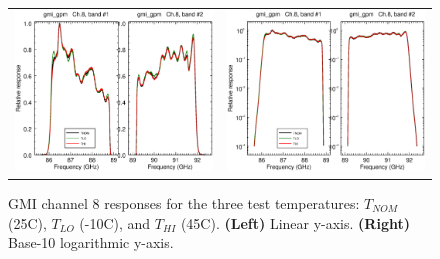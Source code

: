 \begin{figure}[htp]
  \centering
  \begin{tabular}{c c}
    \includegraphics[scale=0.3]{graphics/lin/gmi_gpm-8.eps} &
    \includegraphics[scale=0.3]{graphics/log/gmi_gpm-8.eps}
  \end{tabular}
  \caption{GMI channel 8 responses for the three test temperatures: $T_{NOM}$ (25\textdegree{}C), $T_{LO}$ (-10\textdegree{}C), and $T_{HI}$ (45\textdegree{}C). \textbf{(Left)} Linear y-axis. \textbf{(Right)} Base-10 logarithmic y-axis.}
  \label{fig:ch8_response}
\end{figure}

